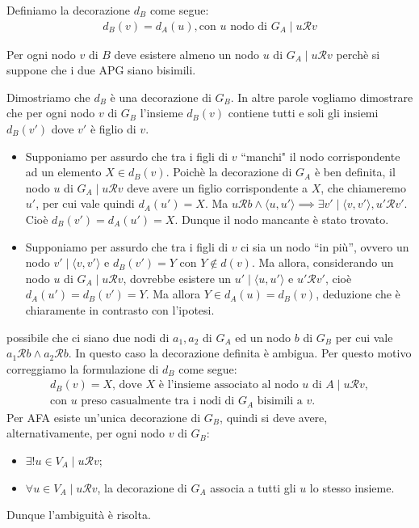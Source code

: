 \begin{proof2}
\begin{enumerate}
        Definiamo la decorazione $d_B$ come segue:
        \begin{gather*}
            d_B(v) = d_A(u), \text{con $u$ nodo di $G_A$} \mid u \mathcal{R} v
        \end{gather*}
        \begin{observation*}
            Per ogni nodo $v$ di $B$ deve esistere almeno un nodo $u$ di $G_A \mid u \mathcal{R} v$ perchè si suppone che i due APG siano bisimili.
        \end{observation*}
        Dimostriamo che $d_B$ è una decorazione di $G_B$. In altre parole vogliamo dimostrare che per ogni nodo $v$ di $G_B$ l'insieme $d_B(v)$ contiene tutti e soli gli insiemi $d_B(v')$ dove $v'$ è figlio di $v$.
        \begin{itemize}
            \item Supponiamo per assurdo che tra i figli di $v$ ``manchi" il nodo corrispondente ad un elemento $X \in d_B(v)$. Poichè la decorazione di $G_A$ è ben definita, il nodo $u$ di $G_A \mid u \mathcal{R} v$ deve avere un figlio corrispondente a $X$, che chiameremo $u'$, per cui vale quindi $d_A(u') = X$. Ma $u \mathcal{R} b \land \langle u, u' \rangle \implies \exists v' \mid \langle v, v' \rangle, u' \mathcal{R} v'$. Cioè $d_B(v') = d_A(u') = X$. Dunque il nodo mancante è stato trovato.
            \item Supponiamo per assurdo che tra i figli di $v$ ci sia un nodo ``in più'', ovvero un nodo $v' \mid \langle v, v' \rangle$ e $d_B(v') = Y$ con $Y \notin d(v)$. Ma allora, considerando un nodo $u$ di $G_A \mid u \mathcal{R} v$, dovrebbe esistere un $u' \mid \langle u, u' \rangle$ e $u' \mathcal{R} v'$, cioè $d_A(u') = d_B(v') = Y$.
            Ma allora $Y \in d_A(u) = d_B(v)$, deduzione che è chiaramente in contrasto con l'ipotesi.
        \end{itemize}
        \accente possibile che ci siano due nodi di $a_1, a_2$ di $G_A$ ed un nodo $b$ di $G_B$ per cui vale $a_1 \mathcal{R} b \land a_2 \mathcal{R} b$. In questo caso la decorazione definita è ambigua. Per questo motivo correggiamo la formulazione di $d_B$ come segue:
        \begin{gather*}
        d_B(v) = X \text{, dove $X$ è l'insieme associato al nodo $u$ di $A$} \mid u \mathcal{R} v, \\
        \text{con $u$ preso casualmente tra i nodi di $G_A$ bisimili a $v$.}
        \end{gather*}
        Per AFA esiste un'unica decorazione di $G_B$, quindi si deve avere, alternativamente, per ogni nodo $v$ di $G_B$:
        \begin{itemize}
            \item $\exists ! u \in V_A \mid u \mathcal{R} v$;
            \item $\forall u \in V_A \mid u \mathcal{R} v$, la decorazione di $G_A$ associa a tutti gli $u$ lo stesso insieme.
        \end{itemize}
        Dunque l'ambiguità è risolta.
    \end{enumerate}
    \vspace*{-0.75cm}
\end{proof2}
